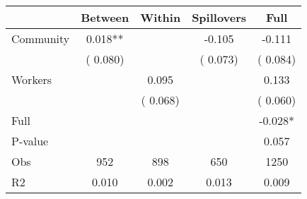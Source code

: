 
\begin{tabular}{l*{4}{c}}\hline&\multicolumn{1}{c}{Between}&\multicolumn{1}{c}{Within}&\multicolumn{1}{c}{Spillovers}&\multicolumn{1}{c}{Full}\\ \hline
 Community             &              0.018**      &                                               &       -0.105 &        -0.111                            \\ 
                               &        (       0.080)           &                                       &       (       0.073)     &      (       0.084)                                           \\ 
 Workers       &                                               &        0.095    &                                &             0.133                            \\ 
                               &                                               & (       0.068)                  &                                        &      (       0.060)                                           \\ 
\hline                                                                                                                                                                                                                                            
 Full                  &                                               &                                               &                                        &            -0.028*                                     \\ 
 P-value               &                                               &                                               &                                        &             0.057                                           \\ 
 Obs                   &               952               &       898                       &       650                &              1250                                               \\ 
 R2                    &                      0.010              &              0.002                      &              0.013               &                     0.009                                              \\ 
\hline \end{tabular}                                                                                                                                                                                                              